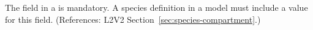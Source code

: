 The  field in a \Species is mandatory.  A species
definition in a model must include a value for this field.  (References:
L2V2 Section~\ref{sec:species-compartment}.)
